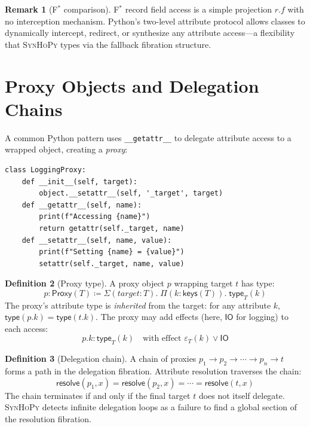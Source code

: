 \documentclass[11pt,a4paper]{report}
\theoremstyle{definition}
\newtheorem{definition}{Definition}[chapter]
\newtheorem{remark}[definition]{Remark}
\theoremstyle{plain}
\newcommand{\defeq}{\coloneqq}
\newcommand{\IO}{\mathsf{IO}}
\newcommand{\fstar}{F$^{*}$}
\newcommand{\synhopy}{\textsc{SynHoPy}}
\begin{document}
\begin{remark}[\fstar{} comparison]
\fstar{} record field access is a simple projection $r.f$ with no
interception mechanism.  Python's two-level attribute protocol allows
classes to dynamically intercept, redirect, or synthesize any attribute
access---a flexibility that \synhopy{} types via the fallback fibration
structure.
\end{remark}

\section{Proxy Objects and Delegation Chains}

A common Python pattern uses \lstinline[style=python]{__getattr__} to
delegate attribute access to a wrapped object, creating a \emph{proxy}:

\begin{lstlisting}[style=python]
class LoggingProxy:
    def __init__(self, target):
        object.__setattr__(self, '_target', target)
    def __getattr__(self, name):
        print(f"Accessing {name}")
        return getattr(self._target, name)
    def __setattr__(self, name, value):
        print(f"Setting {name} = {value}")
        setattr(self._target, name, value)
\end{lstlisting}

\begin{definition}[Proxy type]
A proxy object $p$ wrapping target $t$ has type:
\[
  p : \mathsf{Proxy}(T) \defeq \Sigma(\mathit{target} : T).\;
    \Pi(k : \mathsf{keys}(T)).\; \mathsf{type}_T(k)
\]
The proxy's attribute type is \emph{inherited} from the target: for any
attribute $k$, $\mathsf{type}(p.k) = \mathsf{type}(t.k)$.  The proxy may
add effects (here, $\IO$ for logging) to each access:
\[
  p.k : \mathsf{type}_T(k) \quad \text{with effect } \varepsilon_T(k) \vee \IO
\]
\end{definition}

\begin{definition}[Delegation chain]
A chain of proxies $p_1 \to p_2 \to \cdots \to p_n \to t$ forms a path in
the delegation fibration.  Attribute resolution traverses the chain:
\[
  \mathsf{resolve}(p_1, x) = \mathsf{resolve}(p_2, x) = \cdots =
    \mathsf{resolve}(t, x)
\]
The chain terminates if and only if the final target $t$ does not itself
delegate.  \synhopy{} detects infinite delegation loops as a failure to
find a global section of the resolution fibration.
\end{definition}
\end{document}
